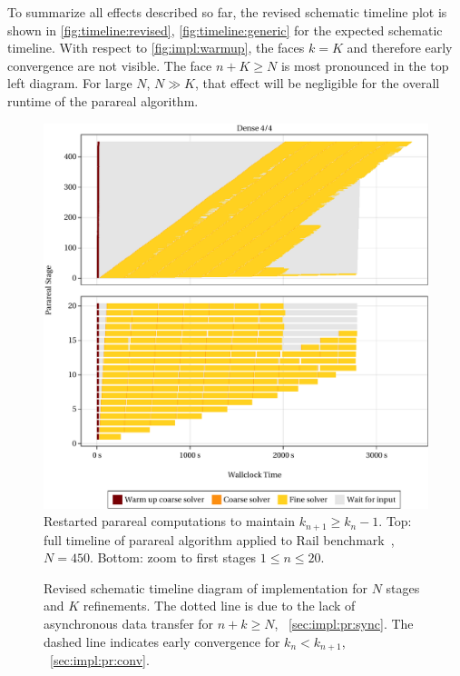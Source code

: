 To summarize all effects described so far,
the revised schematic timeline plot is shown in \autoref{fig:timeline:revised},
\cf \autoref{fig:timeline:generic} for the expected schematic timeline.
With respect to \autoref{fig:impl:warmup},
the faces $k=K$ and therefore early convergence are not visible.
The face $n+K \geq N$ is most pronounced in the top left diagram.
For large $N$, $N \gg K$, that effect will be negligible for the overall runtime of the parareal algorithm.

\begin{figure}[tp]
  \centering
  \includegraphics[width=\textwidth]{figures/fig_timeline_ref.pdf}
  \caption[Restarted parareal computation]{
    Restarted parareal computations to maintain $k_{n+1} \geq k_n - 1$.
    Top: full timeline of parareal algorithm applied to Rail benchmark~\cite{morwiki_steel}, $N=450$.
    Bottom: zoom to first stages $1 \leq n \leq 20$.
  }
  \label{fig:impl:restart}
\end{figure}

\begin{figure}[t]
  \centering
  
  \caption[Revised schematic timeline diagram]{%
    Revised schematic timeline diagram of  implementation for $N$ stages and $K$ refinements.
    The dotted line is due to the lack of asynchronous data transfer for $n+k \geq N$,
    \cf~\autoref{sec:impl:pr:sync}.
    The dashed line indicates early convergence for $k_n < k_{n+1}$,
    \cf~\autoref{sec:impl:pr:conv}.
  }
  \label{fig:timeline:revised}
\end{figure}

